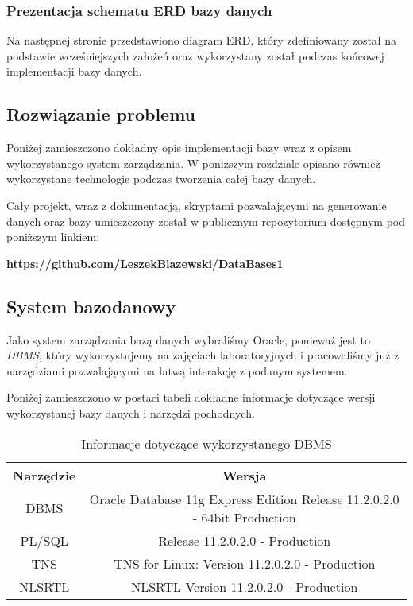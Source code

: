 \documentclass[a4paper]{article}
\begin{document}
\subsubsection{Prezentacja schematu ERD bazy danych}

Na następnej stronie przedstawiono diagram ERD, który zdefiniowany został na podstawie wcześniejszych założeń oraz wykorzystany został podczas końcowej implementacji bazy danych.

\newpage


\subsection{Rozwiązanie problemu}

Poniżej zamieszczono dokładny opis implementacji bazy wraz z opisem wykorzystanego system zarządzania. W poniższym rozdziale opisano również wykorzystane technologie podczas tworzenia całej bazy danych.

Cały projekt, wraz z dokumentacją, skryptami pozwalającymi na generowanie danych oraz bazy umieszczony został w publicznym repozytorium dostępnym pod poniższym linkiem:
\begin{center}
\textbf{https://github.com/LeszekBlazewski/DataBases1}
\end{center}{}


\subsection{System bazodanowy}

Jako system zarządzania bazą danych wybraliśmy Oracle, ponieważ jest to\textit{ DBMS}, który wykorzystujemy na zajęciach laboratoryjnych i pracowaliśmy już z narzędziami pozwalającymi na łatwą interakcję z podanym systemem.

Poniżej zamieszczono w postaci tabeli dokładne informacje dotyczące wersji wykorzystanej bazy danych i narzędzi pochodnych.

\begin{table}[h!]
\centering
\begin{tabular}{|c|c|}
\hline
\textbf{Narzędzie} & \textbf{Wersja}                                                           \\ \hline
DBMS               & Oracle Database 11g Express Edition Release 11.2.0.2.0 - 64bit Production \\ \hline
PL/SQL             & Release 11.2.0.2.0 - Production                                           \\ \hline
TNS                & TNS for Linux: Version 11.2.0.2.0 - Production                            \\ \hline
NLSRTL             & NLSRTL Version 11.2.0.2.0 - Production                                    \\ \hline
\end{tabular}
\caption{Informacje dotyczące wykorzystanego DBMS}
\label{tab:my-table}
\end{table}
\end{document}
